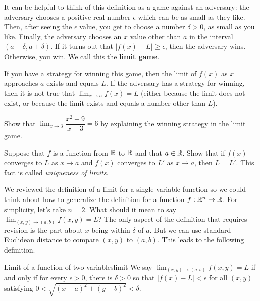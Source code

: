 \documentclass[svgnames]{watsonbook}
\begin{document}
It can be helpful to think of this definition as a game against an
adversary: the adversary chooses a positive real number $\epsilon$
which can be as small as they like. Then, after seeing the $\epsilon$
value, you get to choose a number $\delta>0$, as small as you
like. Finally, the adversary chooses an $x$ value other than $a$ in
the interval $(a-\delta, a + \delta)$. If it turns out that $|f(x) -
L| \geq \epsilon$, then the adversary wins. Otherwise, you win. We
call this the \textbf{limit game}. 

If you have a strategy for winning this game, then the limit of $f(x)$
as $x$ approaches $a$ exists and equals $L$. If the adversary has a
strategy for winning, then it is not true that $\lim_{x \to a} f(x) =
L$ (either because the limit does not exist, or because the limit
exists and equals a number other than $L$).

\begin{exercise}{}{}
  Show that $\displaystyle{\lim_{x \to 3}}\dfrac{x^2 - 9}{x - 3} = 6$ by explaining
  the winning strategy in the limit game. 
\end{exercise}

\begin{exercise}{}{}
  Suppose that $f$ is a function from $\mathbb{R}$ to $\mathbb{R}$ and that
  $a \in \mathbb{R}$. Show that if $f(x)$ converges to $L$ as $x\to a$ and
  $f(x)$ converges to $L'$ as $x\to a$, then $L = L'$. This fact is called
  \textit{uniqueness of limits}. 
\end{exercise}

We reviewed the definition of a limit for a single-variable function
so we could think about how to generalize the definition for a
function $f:\mathbb{R}^n \to \mathbb{R}$. For simplicity, let's take $n = 2$. What
should it mean to say
$\displaystyle{\lim_{(x,y) \to (a,b)} f(x,y)} = L$? The only aspect of 
the definition that requires revision is the part about $x$ being
within $\delta$ of $a$. But we can use standard Euclidean distance to
compare $(x,y)$ to $(a,b)$. This leads to the following definition. 

\begin{defn}{Limit of a function of two variables}{limit}
  We say $\lim_{(x,y)\to (a,b)} f(x,y) = L$ if and only if for every
  $\epsilon > 0$, there is $\delta>0$ so that $|f(x) - L| < \epsilon$
  for all $(x,y)$ satisfying $0 < \sqrt{(x -a)^2 + (y-b)^2} < \delta$. 
\end{defn}
\end{document}

